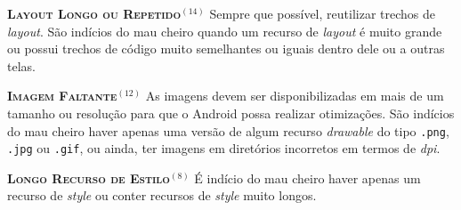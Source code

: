   \noindent
  \textbf{\textsc{{\small Layout Longo ou Repetido}}}$^{(14)}$
      Sempre que possível, reutilizar trechos de \textit{layout}. São indícios do mau cheiro quando um recurso de \textit{layout} é muito grande ou possui trechos de código muito semelhantes ou iguais dentro dele ou a outras telas. 


  \noindent
  \textbf{\textsc{{\small Imagem Faltante}}}$^{(12)}$
      As imagens devem ser disponibilizadas em mais de um tamanho ou resolução para que o Android possa realizar otimizações. São indícios do mau cheiro haver apenas uma versão de algum recurso \textit{drawable} do tipo \texttt{.png}, \texttt{.jpg} ou \texttt{.gif}, ou ainda, ter imagens em diretórios incorretos em termos de \textit{dpi}.


  \noindent
  \textbf{\textsc{{\small Longo Recurso de Estilo}}}$^{(8)}$
      É indício do mau cheiro haver apenas um recurso de \textit{style} ou conter recursos de \textit{style} muito longos.


